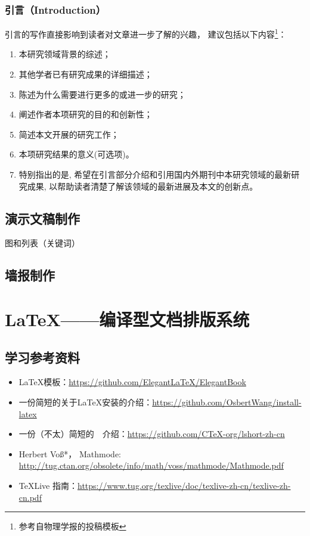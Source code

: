 \subsection{引言（Introduction）}
引言的写作直接影响到读者对文章进一步了解的兴趣， 建议包括以下内容\footnote{参考自物理学报的投稿模板}：
\begin{enumerate}
\item 本研究领域背景的综述；
\item 其他学者已有研究成果的详细描述；
\item 陈述为什么需要进行更多的或进一步的研究；
\item 阐述作者本项研究的目的和创新性；
\item 简述本文开展的研究工作；
\item 本项研究结果的意义(可选项)。
\item 特别指出的是, 希望在引言部分介绍和引用国内外期刊中本研究领域的最新研究成果, 以帮助读者清楚了解该领域的最新进展及本文的创新点。
\end{enumerate}



\section{演示文稿制作}
图和列表（关键词）



\section{墙报制作}




\chapter{\LaTeX{}——编译型文档排版系统}
\section{学习参考资料}
\begin{itemize}
\item \LaTeX{}模板：\url{https://github.com/ElegantLaTeX/ElegantBook}
\item 一份简短的关于\LaTeX{}安装的介绍：\url{https://github.com/OsbertWang/install-latex}
\item 一份（不太）简短的~\LaTeXe{}~介绍：\url{https://github.com/CTeX-org/lshort-zh-cn}
\item Herbert Voß*，  Mathmode: \url{http://tug.ctan.org/obsolete/info/math/voss/mathmode/Mathmode.pdf}
\item \TeX Live 指南：\url{https://www.tug.org/texlive/doc/texlive-zh-cn/texlive-zh-cn.pdf}
\end{itemize}


